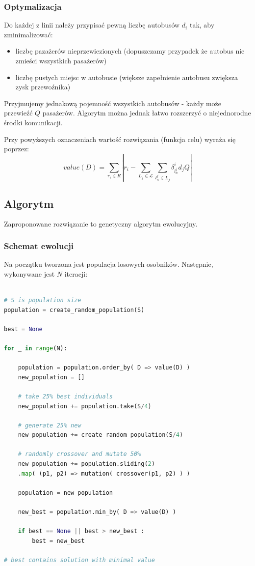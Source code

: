 \documentclass[polish,12pt]{aghthesis}
\begin{document}
\subsubsection{Optymalizacja}
Do każdej z linii należy przypisać pewną liczbę autobusów $d_i$ tak, aby zminimalizować:
\begin{itemize}
	\item liczbę pazażerów nieprzewiezionych (dopuszczamy przypadek że autobus nie zmieści wszystkich pasażerów)
	\item liczbę pustych miejsc w autobusie (większe zapełnienie autobusu zwiększa zysk przewoźnika)
\end{itemize}

Przyjmujemy jednakową pojemność wszystkich autobusów - każdy może przewieźć $Q$ pasażerów. Algorytm można jednak łatwo rozszerzyć o niejednorodne środki komunikacji.

Przy powyższych oznaczeniach wartość rozwiązania (funkcja celu) wyraża się poprzez:
\begin{equation}
value(D) = \sum_{r_i \in R}|
	r_i - \sum_{L_j \in \mathcal{L}}\sum_{l_n^j \in L_j} \delta_{l_n^j}^i d_j Q
| 
\end{equation}

\subsection{Algorytm}
Zaproponowane rozwiązanie to genetyczny algorytm ewolucyjny.

\subsubsection{Schemat ewolucji}
Na początku tworzona jest populacja losowych osobników. Następnie, wykonywane jest $N$ iteracji:

\begin{lstlisting}[language=Python]

# S is population size
population = create_random_population(S)

best = None

for _ in range(N):

	population = population.order_by( D => value(D) )
	new_population = []
	
	# take 25% best individuals
	new_population += population.take(S/4)
	
	# generate 25% new
	new_population += create_random_population(S/4)
	
	# randomly crossover and mutate 50%
	new_population += population.sliding(2)
	.map( (p1, p2) => mutation( crossover(p1, p2) ) )
	
	population = new_population
	
	new_best = population.min_by( D => value(D) )
	
	if best == None || best > new_best :
		best = new_best
		
# best contains solution with minimal value
\end{lstlisting}
\end{document}
